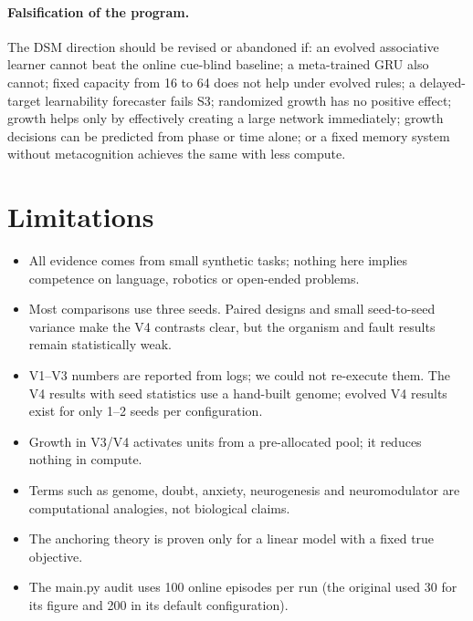 \documentclass[11pt]{article}
\theoremstyle{remark}
\begin{document}
\paragraph{Falsification of the program.} The DSM direction should be revised or abandoned if: an evolved associative
learner cannot beat the online cue-blind baseline; a meta-trained GRU also cannot; fixed capacity from 16 to 64 does
not help under evolved rules; a delayed-target learnability forecaster fails S3; randomized growth has no positive
effect; growth helps only by effectively creating a large network immediately; growth decisions can be predicted
from phase or time alone; or a fixed memory system without metacognition achieves the same with less compute.

\section{Limitations}
\begin{itemize}
  \item All evidence comes from small synthetic tasks; nothing here implies competence on language, robotics or
        open-ended problems.
  \item Most comparisons use three seeds. Paired designs and small seed-to-seed variance make the V4 contrasts
        clear, but the organism and fault results remain statistically weak.
  \item V1--V3 numbers are reported from logs; we could not re-execute them. The V4 results with seed statistics use a
        hand-built genome; evolved V4 results exist for only 1--2 seeds per configuration.
  \item Growth in V3/V4 activates units from a pre-allocated pool; it reduces nothing in compute.
  \item Terms such as genome, doubt, anxiety, neurogenesis and neuromodulator are computational analogies, not
        biological claims.
  \item The anchoring theory is proven only for a linear model with a fixed true objective.
  \item The main.py audit uses 100 online episodes per run (the original used 30 for its figure and 200 in its
        default configuration).
\end{itemize}

\end{document}
